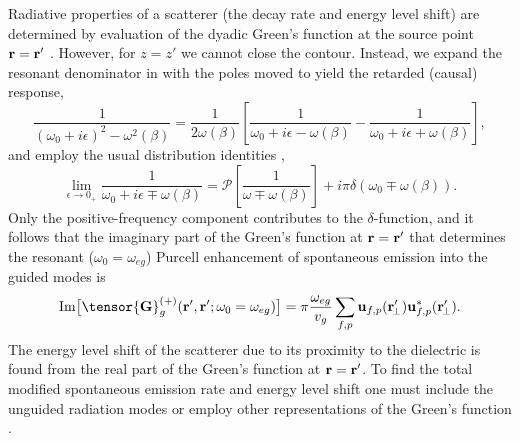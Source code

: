 \documentclass[aps,pra,twocolumn]{revtex4-1} %
\begin{document}
Radiative properties of a scatterer (the decay rate and energy level shift) are determined by evaluation of the dyadic Green's function at the source point $\mathbf{r} = \mathbf{r}'$ \cite{fussell_decay_2005}.  However, for $z=z'$ we cannot close the contour. Instead, we expand the resonant denominator in  with the poles moved to yield the retarded (causal) response,
\begin{equation}
\frac{1}{(\omega_0+i\epsilon)^2-\omega^2(\beta)}=\frac{1}{2 \omega(\beta)}\left[ \frac{1}{\omega_0+ i 
\epsilon - \omega(\beta)} - \frac{1}{\omega_0+ i \epsilon + \omega(\beta)} \right],
\end{equation}
 and employ the usual distribution identities \cite{sondergaard_general_2001},
\begin{equation}
\lim_{\epsilon \rightarrow 0_+} \frac{1}{\omega_0 + i \epsilon \mp 
\omega(\beta)}=\mathcal{P}\left[\frac{1}{\omega \mp \omega(\beta)} \right] + i \pi \delta (\omega_0 \mp 
\omega(\beta)).
\end{equation}
Only the positive-frequency component contributes to the $\delta$-function, and it follows that the imaginary part of the Green's function at $\mathbf{r} = \mathbf{r}'$ that determines the resonant ($\omega_0 = \omega_{eg}$) Purcell enhancement of spontaneous emission into the guided modes is \cite{dung_spontaneous_2000, fussell_decay_2005, chen_finite-element_2010}
	\begin{equation}\label{Eq::ImGreenLocal}
		{\rm Im} \big[\tensor{\mathbf{G}}^{(+)}_g(\br',\br'; \omega_0=\omega_{eg}) \big] = \pi \frac{\omega_{eg}}{v_g } \sum_{f, p} 
		\mathbf{u}_{f, p} (\br_{\!\perp}^\prime)\mathbf{u}^*_{f , p} (\br_{\!\perp}^\prime).
	\end{equation}
The energy level shift of the scatterer due to its proximity to the dielectric is found from the real part of the Green's function at $\mathbf{r} = \mathbf{r}'$. 
To find the total modified spontaneous emission rate and energy level shift one must include the unguided radiation modes \cite{le_kien_spontaneous_2005} or employ other representations of the Green's function \cite{klimov_spontaneous_2004}.  
\end{document}
